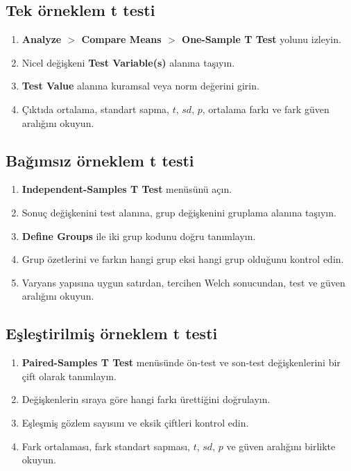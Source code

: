 \subsection*{Tek örneklem t testi}

\begin{enumerate}
  \item \textbf{Analyze $>$ Compare Means $>$ One-Sample T Test} yolunu izleyin.
  \item Nicel değişkeni \textbf{Test Variable(s)} alanına taşıyın.
  \item \textbf{Test Value} alanına kuramsal veya norm değerini girin.
  \item Çıktıda ortalama, standart sapma, $t$, $sd$, $p$, ortalama farkı ve fark güven aralığını okuyun.
\end{enumerate}

\subsection*{Bağımsız örneklem t testi}

\begin{enumerate}
  \item \textbf{Independent-Samples T Test} menüsünü açın.
  \item Sonuç değişkenini test alanına, grup değişkenini gruplama alanına taşıyın.
  \item \textbf{Define Groups} ile iki grup kodunu doğru tanımlayın.
  \item Grup özetlerini ve farkın hangi grup eksi hangi grup olduğunu kontrol edin.
  \item Varyans yapısına uygun satırdan, tercihen Welch sonucundan, test ve güven aralığını okuyun.
\end{enumerate}

\subsection*{Eşleştirilmiş örneklem t testi}

\begin{enumerate}
  \item \textbf{Paired-Samples T Test} menüsünde ön-test ve son-test değişkenlerini bir çift olarak tanımlayın.
  \item Değişkenlerin sıraya göre hangi farkı ürettiğini doğrulayın.
  \item Eşleşmiş gözlem sayısını ve eksik çiftleri kontrol edin.
  \item Fark ortalaması, fark standart sapması, $t$, $sd$, $p$ ve güven aralığını birlikte okuyun.
\end{enumerate}

